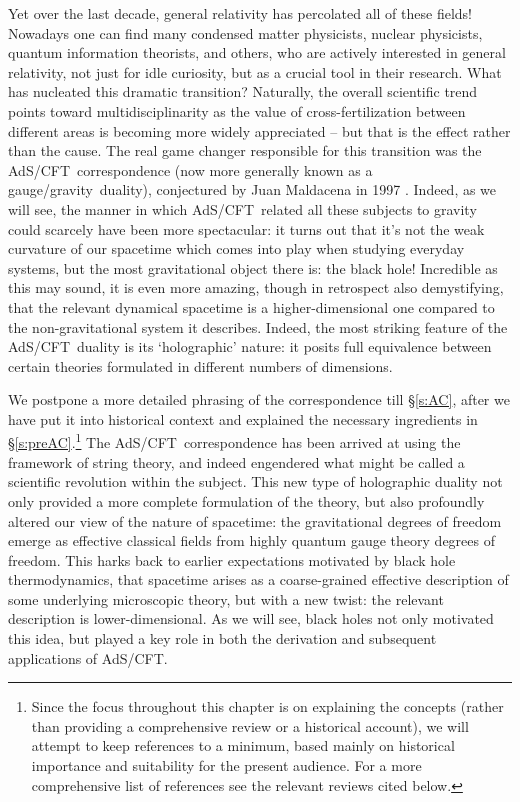 \documentclass[12pt]{article}
\def\sect#1{\S\ref{#1}}
\def\AC{AdS/CFT}
\def\GG{gauge/gravity}
\begin{document}
Yet over the last decade, general relativity has percolated all of these fields!  Nowadays one can find many condensed matter physicists, nuclear physicists, quantum information theorists, and others, who are actively interested in general relativity, not just for idle curiosity, but as a crucial tool in their research.  What has nucleated this dramatic transition?  Naturally,  the overall scientific trend points toward multidisciplinarity as the value of cross-fertilization between different areas is becoming more widely appreciated -- but that is the effect rather than the cause.  The real game changer responsible for this transition was the \AC\ correspondence (now more generally known as a \GG\ duality), conjectured by Juan Maldacena in 1997 \cite{Maldacena:1997re}.  Indeed, as we will see,  the manner in which \AC\ related all these subjects to gravity could scarcely have been more spectacular: it turns out that it's not the weak curvature of our spacetime which comes into play when studying everyday systems, but the most gravitational object there is: the black hole!  Incredible as this may sound, it is even more amazing, though in retrospect also demystifying, that the relevant dynamical spacetime is a higher-dimensional one compared to the non-gravitational system it describes.  Indeed, the most striking feature of the \AC\ duality is its `holographic' nature: it posits full equivalence between certain  theories formulated in different numbers of dimensions.

We postpone a more detailed phrasing of the correspondence till \sect{s:AC}, after we have put it into historical context and explained the necessary ingredients in \sect{s:preAC}.\footnote{
Since the focus throughout this chapter is on explaining the concepts (rather than providing a comprehensive review or a historical account), we will attempt to keep references to a minimum,  based mainly on historical importance and suitability for the present audience.  For a more comprehensive list of references see the relevant reviews cited below.
}  
The \AC\ correspondence has been arrived at using the framework of string theory, and indeed engendered what might be called  
a scientific revolution within the subject. 
This new type of holographic duality not only provided a more complete formulation of the theory,  but also profoundly altered our view of the nature of spacetime:  the gravitational degrees of freedom emerge  as effective classical fields from  highly quantum gauge theory degrees of freedom.  This harks back to earlier expectations motivated by black hole thermodynamics, that spacetime arises as a coarse-grained effective description of some underlying microscopic theory, but with a new twist: the relevant description is lower-dimensional.  As we will see, black holes not only motivated this idea, but played a key role in both the derivation and subsequent applications of \AC.
\end{document}
